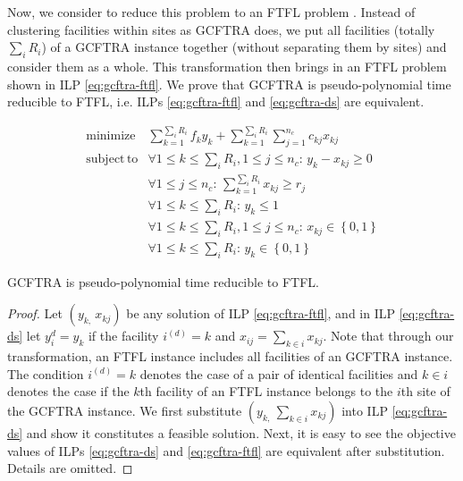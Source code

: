 \documentclass[10pt]{llncs}
\begin{document}
Now, we consider to reduce this problem to an FTFL problem \cite{Jain00FTFL}.
Instead of clustering facilities within sites as GCFTRA does, we put
all facilities (totally $\sum_{i}R_{i}$) of a GCFTRA instance together
(without separating them by sites) and consider them as a whole. This
transformation then brings in an FTFL problem shown in ILP \eqref{eq:gcftra-ftfl}.
We prove that GCFTRA is pseudo-polynomial time reducible to FTFL,
i.e. ILPs \eqref{eq:gcftra-ftfl} and \eqref{eq:gcftra-ds} are equivalent.

{\small \begin{equation}
\begin{array}{llc}
\mathrm{minimize} & \sum_{k=1}^{\sum_{i}R_{i}}f_{k}y_{k}+\sum_{k=1}^{\sum_{i}R_{i}}\sum_{j=1}^{n_{c}}c_{kj}x_{kj}\\
\mathrm{subject\, to} & \forall1\leq k\leq\sum_{i}R_{i},1\leq j\leq n_{c}:\, y_{k}-x_{kj}\ge0\\
 & \forall1\leq j\leq n_{c}:\,\sum_{k=1}^{\sum_{i}R_{i}}x_{kj}\geq r_{j}\\
 & \forall1\leq k\leq\sum_{i}R_{i}:\, y_{k}\leq1\\
 & \forall1\leq k\leq\sum_{i}R_{i},1\leq j\leq n_{c}:\, x_{kj}\in\left\{ 0,1\right\} \\
 & \forall1\leq k\leq\sum_{i}R_{i}:\, y_{k}\in\left\{ 0,1\right\} \end{array}\label{eq:gcftra-ftfl}\end{equation}
}{\small \par}
\begin{theorem}
GCFTRA is pseudo-polynomial time reducible to FTFL.\end{theorem}
\begin{proof}
Let $\left(y_{k,}\, x_{kj}\right)$ be any solution of ILP \eqref{eq:gcftra-ftfl},
and in ILP \eqref{eq:gcftra-ds} let $y_{i}^{d}=y_{k}$ if the facility
$i^{\left(d\right)}=k$ and $x_{ij}=\sum_{k\in i}x_{kj}$. Note that
through our transformation, an FTFL instance includes all facilities
of an GCFTRA instance. The condition $i^{\left(d\right)}=k$ denotes
the case of a pair of identical facilities and $k\in i$ denotes the
case if the $k$th facility of an FTFL instance belongs to the $i$th
site of the GCFTRA instance. We first substitute $\left(y_{k,}\,\sum_{k\in i}x_{kj}\right)$
into ILP \eqref{eq:gcftra-ds} and show it constitutes a feasible
solution. Next, it is easy to see the objective values of ILPs \eqref{eq:gcftra-ds}
and \eqref{eq:gcftra-ftfl} are equivalent after substitution. Details
are omitted.
\end{proof}
 

 
\end{document}
